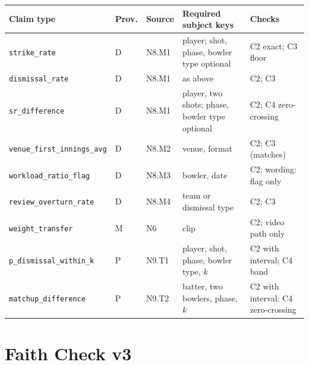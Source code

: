 \documentclass[11pt,a4paper]{article}
\begin{document}
\begin{center}
\footnotesize
\renewcommand{\arraystretch}{1.2}
\begin{tabular}{@{}>{\raggedright\arraybackslash}p{4.3cm}
                  >{\raggedright\arraybackslash}p{1.0cm}
                  >{\raggedright\arraybackslash}p{1.3cm}
                  >{\raggedright\arraybackslash}p{4.2cm}
                  >{\raggedright\arraybackslash}p{4.1cm}@{}}
\toprule
\textbf{Claim type} & \textbf{Prov.} & \textbf{Source} & \textbf{Required subject keys} & \textbf{Checks} \\
\midrule
\texttt{strike\_rate} & D & N8.M1 & player; shot, phase, bowler type optional & C2 exact; C3 floor \\
\texttt{dismissal\_rate} & D & N8.M1 & as above & C2; C3 \\
\texttt{sr\_difference} & D & N8.M1 & player, two shots; phase, bowler type optional & C2; C4 zero-crossing \\
\texttt{venue\_first\_innings\_avg} & D & N8.M2 & venue, format & C2; C3 (matches) \\
\texttt{workload\_ratio\_flag} & D & N8.M3 & bowler, date & C2; wording: flag only \\
\texttt{review\_overturn\_rate} & D & N8.M4 & team or dismissal type & C2; C3 \\
\texttt{weight\_transfer} & M & N6 & clip & C2; video path only \\
\texttt{p\_dismissal\_within\_k} & P & N9.T1 & player, shot, phase, bowler type, $k$ & C2 with interval; C4 band \\
\texttt{matchup\_difference} & P & N9.T2 & batter, two bowlers, phase, $k$ & C2 with interval; C4 zero-crossing \\
\bottomrule
\end{tabular}
\label{tab:registry}
\end{center}

\section{Faith Check v3}
\label{sec:faith}
\end{document}
